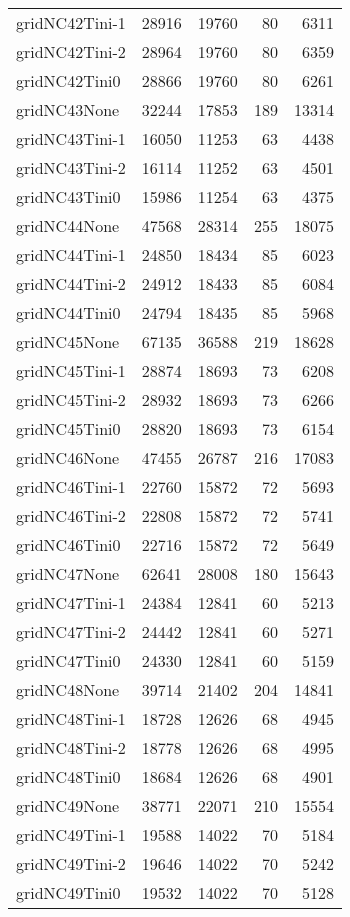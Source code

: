 \begin{longtable}{lrrrr}
gridNC42Tini-1 & 28916 & 19760 & 80 & 6311 \\
gridNC42Tini-2 & 28964 & 19760 & 80 & 6359 \\
gridNC42Tini0 & 28866 & 19760 & 80 & 6261 \\
gridNC43None & 32244 & 17853 & 189 & 13314 \\
gridNC43Tini-1 & 16050 & 11253 & 63 & 4438 \\
gridNC43Tini-2 & 16114 & 11252 & 63 & 4501 \\
gridNC43Tini0 & 15986 & 11254 & 63 & 4375 \\
gridNC44None & 47568 & 28314 & 255 & 18075 \\
gridNC44Tini-1 & 24850 & 18434 & 85 & 6023 \\
gridNC44Tini-2 & 24912 & 18433 & 85 & 6084 \\
gridNC44Tini0 & 24794 & 18435 & 85 & 5968 \\
gridNC45None & 67135 & 36588 & 219 & 18628 \\
gridNC45Tini-1 & 28874 & 18693 & 73 & 6208 \\
gridNC45Tini-2 & 28932 & 18693 & 73 & 6266 \\
gridNC45Tini0 & 28820 & 18693 & 73 & 6154 \\
gridNC46None & 47455 & 26787 & 216 & 17083 \\
gridNC46Tini-1 & 22760 & 15872 & 72 & 5693 \\
gridNC46Tini-2 & 22808 & 15872 & 72 & 5741 \\
gridNC46Tini0 & 22716 & 15872 & 72 & 5649 \\
gridNC47None & 62641 & 28008 & 180 & 15643 \\
gridNC47Tini-1 & 24384 & 12841 & 60 & 5213 \\
gridNC47Tini-2 & 24442 & 12841 & 60 & 5271 \\
gridNC47Tini0 & 24330 & 12841 & 60 & 5159 \\
gridNC48None & 39714 & 21402 & 204 & 14841 \\
gridNC48Tini-1 & 18728 & 12626 & 68 & 4945 \\
gridNC48Tini-2 & 18778 & 12626 & 68 & 4995 \\
gridNC48Tini0 & 18684 & 12626 & 68 & 4901 \\
gridNC49None & 38771 & 22071 & 210 & 15554 \\
gridNC49Tini-1 & 19588 & 14022 & 70 & 5184 \\
gridNC49Tini-2 & 19646 & 14022 & 70 & 5242 \\
gridNC49Tini0 & 19532 & 14022 & 70 & 5128 \\

\end{longtable}
